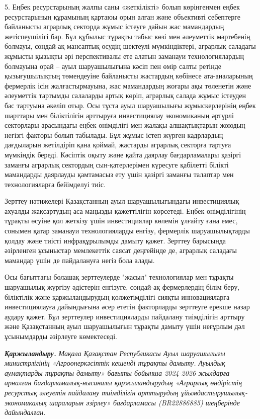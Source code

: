 \begin{multicols}{2}
5. Еңбек ресурстарының жалпы саны «жеткілікті» болып көрінгенмен еңбек
ресурстарының құрамының қартаюы орын алған және объективті себептерге
байланысты аграрлық секторда жұмыс істеуге дайын жас мамандардың
жетіспеушілігі бар. Бұл құбылыс тұрақты табыс көзі мен әлеуметтік
мәртебенің болмауы, сондай-ақ мансаптық өсудің шектеулі мүмкіндіктері,
аграрлық саладағы жұмысты қызықты әрі перспективалы ете алатын заманауи
технологиялардың болмауына орай -- ауыл шаруашылығына кәсіп пен өмір
салты ретінде қызығушылықтың төмендеуіне байланысты жастардың көбінесе
ата-аналарының фермерлік ісін жалғастырмауына, жас мамандардың жоғары
ақы төленетін және әлеуметтік тартымды салаларды артық көріп, аграрлық
салада жұмыс істеуден бас тартуына әкеліп отыр. Осы тұста ауыл
шаруашылығы жұмыскерлерінің еңбек шарттары мен біліктілігін арттыруға
инвестициялау экономиканың әртүрлі секторлары арасындағы еңбек
өнімділігі мен жалақы алшақтықтарын жоюдың негізгі факторы болып
табылады. Бұл жұмыс істеп жүрген кадрлардың дағдыларын жетілдіріп қана
қоймай, жастарды аграрлық секторға тартуға мүмкіндік береді. Кәсіптік
оқыту және қайта даярлау бағдарламалары қазіргі заманғы аграрлық
сектордың сын-қатерлерімен күресуге қабілетті білікті мамандарды
даярлауды қамтамасыз ету үшін қазіргі заманғы талаптар мен
технологияларға бейімделуі тиіс.

Зерттеу нәтижелері Қазақстанның ауыл шаруашылығындағы инвестициялық
ахуалды жақсартудың аса маңызды қажеттілігін көрсетеді. Еңбек
өнімділігінің тұрақты өсуіне қол жеткізу үшін инвестициялар көлемін
ұлғайту ғана емес, сонымен қатар заманауи технологияларды енгізу,
фермерлік шаруашылықтарды қолдау және тиісті инфрақұрылымды дамыту
қажет. Зерттеу барысында әзірленген ұсыныстар мемлекеттік саясат
деңгейінде де, аграрлық саладағы мамандар үшін де пайдалануға негіз бола
алады.

Осы бағыттағы болашақ зерттеулерде "жасыл" технологиялар мен тұрақты
шаруашылық жүргізу әдістерін енгізуге, сондай-ақ фермерлердің білім
беру, біліктілік және қаржыландырудың қолжетімділігі сияқты
инновацияларға инвестициялауға дайындығына әсер ететін факторларды
зерттеуге ерекше назар аудару қажет. Бұл зерттеулер инвестицияларды
пайдалану тиімділігін арттыру және Қазақстанның ауыл шаруашылығын
тұрақты дамыту үшін неғұрлым дәл ұсынымдарды әзірлеуге көмектеседі.

\emph{{\bfseries Қаржыландыру.}} \emph{Мақала Қазақстан Республикасы Ауыл
шаруашылығы министрлігінің «Агроөнеркәсіптік кешенді тұрақты дамыту.
Ауылдық аумақтарды тұрақты дамыту» бағыты бойынша 2024-2026 жылдарға
арналған бағдарламалық-нысаналы қаржыландырудың «Аграрлық өндірістің
ресурстық әлеуетін пайдалану тиімділігін арттырудың
ұйымдастырушылық-экономикалық шараларын әзірлеу» бағдарламасы
(BR22886885) шеңберінде дайындалған.}
\end{multicols}

